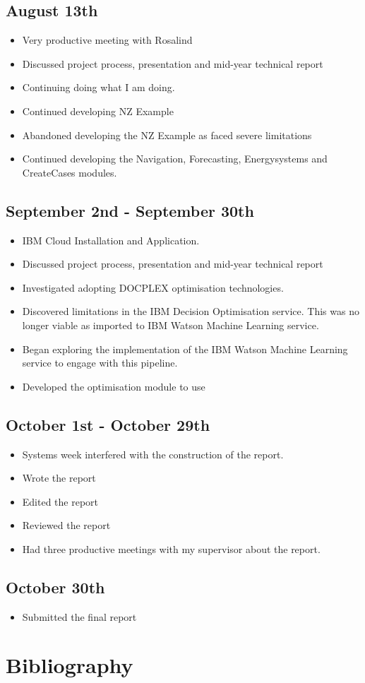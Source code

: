 \documentclass[12pt]{article}
\begin{document}
\subsection*{August 13th}
\begin{itemize}
	\item Very productive meeting with Rosalind
	\item Discussed project process, presentation and mid-year technical report
	\item Continuing doing what I am doing.
	\item Continued developing NZ Example
	\item Abandoned developing the NZ Example as faced severe limitations
	\item Continued developing the Navigation, Forecasting, Energysystems and CreateCases modules.
\end{itemize}
\subsection*{September 2nd - September 30th}
\begin{itemize}
	\item IBM Cloud Installation and Application.
	\item Discussed project process, presentation and mid-year technical report
	\item Investigated adopting DOCPLEX optimisation technologies.
	\item Discovered limitations in the IBM Decision Optimisation service. This was no longer viable as imported to IBM Watson Machine Learning service.
	\item Began exploring the implementation of the IBM Watson Machine Learning service to engage with this pipeline.
	\item Developed the optimisation module to use
\end{itemize}
\subsection*{October 1st - October 29th}
\begin{itemize}
	\item Systems week interfered with the construction of the report.
	\item Wrote the report
	\item Edited the report
	\item Reviewed the report
	\item Had three productive meetings with my supervisor about the report.
\end{itemize}
\subsection*{October 30th}
\begin{itemize}
	\item Submitted the final report
\end{itemize}
\section{Bibliography}
\printbibliography
\end{document}
